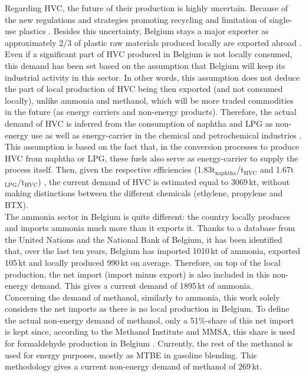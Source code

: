 Regarding \gls{HVC}, the future of their production is highly uncertain. Because of the new regulations and strategies promoting recycling and limitation of single-use plastics \cite{EU_plastics}.  Besides this uncertainty, Belgium stays a major exporter as approximately 2/3 of plastic raw materials produced locally are exported abroad \cite{agoria_plastics}. Even if a significant part of \gls{HVC} produced in Belgium is not locally consumed, this demand has been set based on the assumption that Belgium will keep its industrial activity in this sector. In other words, this assumption does not deduce the part of local production  of \gls{HVC} being then exported (and not consumed locally), unlike ammonia and methanol, which will be more traded commodities in the future (as energy carriers and non-energy products). Therefore, the actual demand of \gls{HVC} is inferred from the consumption of naphtha and \gls{LPG} as non-energy use as well as energy-carrier in the chemical and petrochemical industries \cite{statbel_NED_2019}. This assumption is based on the fact that, in the conversion processes to produce \gls{HVC} from naphtha or \gls{LPG}, these fuels also serve as energy-carrier to supply the process itself. Then, given the respective efficiencies (1.83t$_{\text{naphtha}}$/t$_{\text{HVC}}$ and 1.67t$_{\text{LPG}}$/t$_{\text{HVC}}$) \cite{IEA2018_petrochemicals}, the current demand of \gls{HVC} is estimated equal to 3069\,kt, without making distinctions between the different chemicals (\ie ethylene, propylene and \gls{BTX}). \\

The ammonia sector in Belgium is quite different: the country locally produces and imports ammonia much more than it exports it. Thanks to a database from the United Nations \cite{UN_statistics} and the National Bank of Belgium, it has been identified that, over the last ten years, Belgium has imported 1010\,kt of ammonia, exported 105\,kt and locally produced 990\,kt on average. Therefore, on top of the local production, the net import (\ie import minus export) is also included in this non-energy demand. This gives a current demand of 1895\,kt of ammonia.\\

Concerning the demand of methanol, similarly to ammonia, this work solely considers the net imports as there is no local production in Belgium. To define the actual non-energy demand of methanol, only a 51\%-share of this net import is kept since, according to the Methanol Institute and \gls{MMSA}, this share is used for formaldehyde production in Belgium \cite{MMSA51}. Currently, the rest of the methanol is used for energy purposes, mostly as \gls{MTBE} in gasoline blending. This methodology gives a current non-energy demand of methanol of 269\,kt.\\

